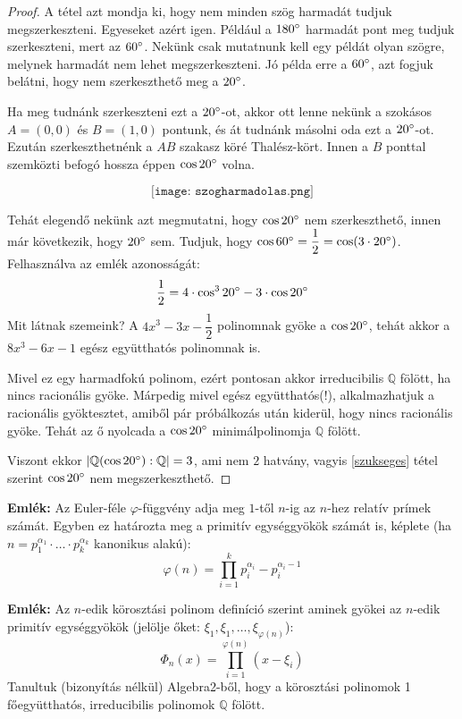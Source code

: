 \documentclass[12pt]{book}
\theoremstyle{plain} %
\theoremstyle{definition} %
\theoremstyle{remark}
\numberwithin{equation}{section}  %
\begin{document}
	\begin{proof}
		A tétel azt mondja ki, hogy nem minden szög harmadát tudjuk megszerkeszteni. Egyeseket azért igen. Például a $180\degree$ harmadát pont meg tudjuk szerkeszteni, mert az $60\degree$. Nekünk csak mutatnunk kell egy példát olyan szögre, melynek harmadát nem lehet megszerkeszteni. Jó példa erre a $60\degree$, azt fogjuk belátni, hogy nem szerkeszthető meg a $20\degree$.
		
		Ha meg tudnánk szerkeszteni ezt a $20\degree$-ot, akkor ott lenne nekünk a szokásos $A=(0,0)$ és $B=(1,0)$ pontunk, és át tudnánk másolni oda ezt a $20\degree$-ot. Ezután szerkeszthetnénk a $AB$ szakasz köré Thalész-kört. Innen a $B$ ponttal szemközti befogó hossza éppen $\cos20\degree$ volna.
		
		\[ \texttt{[image: szogharmadolas.png]} \]
		
		Tehát elegendő nekünk azt megmutatni, hogy $\cos20\degree$ nem szerkeszthető, innen már következik, hogy $20\degree$ sem. Tudjuk, hogy $\cos 60\degree = \dfrac{1}{2} = \cos (3\cdot 20\degree)$. Felhasználva az emlék azonosságát:
		\[ \dfrac{1}{2} = 4\cdot \cos^3 20\degree -3\cdot \cos 20\degree  \]
		Mit látnak szemeink? A $4x^3-3x-\dfrac{1}{2}$ polinomnak gyöke a $\cos 20\degree$, tehát akkor a $8x^3-6x-1$ egész együtthatós polinomnak is.
		
		Mivel ez egy harmadfokú polinom, ezért pontosan akkor irreducibilis $\mathbb{Q}$ fölött, ha nincs racionális gyöke. Márpedig mivel egész együtthatós(!), alkalmazhatjuk a racionális gyöktesztet, amiből pár próbálkozás után kiderül, hogy nincs racionális gyöke. Tehát az ő nyolcada a $\cos 20\degree$ minimálpolinomja $\mathbb{Q}$ fölött.
		
		Viszont ekkor $|\mathbb{Q}(\cos20\degree):\mathbb{Q}|=3$, ami nem $2$ hatvány, vagyis \ref{szukseges} tétel szerint $\cos 20\degree
		$ nem megszerkeszthető.
	\end{proof}

	\textbf{Emlék:} Az Euler-féle $\varphi$-függvény adja meg $1$-től $n$-ig az $n$-hez relatív prímek számát. Egyben ez határozta meg a primitív egységgyökök számát is, képlete (ha $n=p_1^{\alpha_1}\cdot \ldots \cdot p_k^{\alpha_k}$ kanonikus alakú):
	\[ \varphi(n) = \prod_{i=1}^{k} p_i^{\alpha_i}-p_i^{\alpha_i-1}    \]
	
	\textbf{Emlék:} Az $n$-edik körosztási polinom definíció szerint aminek gyökei az $n$-edik primitív egységgyökök (jelölje őket: $\xi_1,\xi_1,\ldots,\xi_{\varphi(n)}$):
	\[ \varPhi_n(x) = \prod_{i=1}^{\varphi(n)} (x-\xi_i) \]
	Tanultuk (bizonyítás nélkül) Algebra2-ből, hogy a körosztási polinomok 1 főegyütthatós, irreducibilis polinomok $\mathbb{Q}$ fölött.
\end{document}
